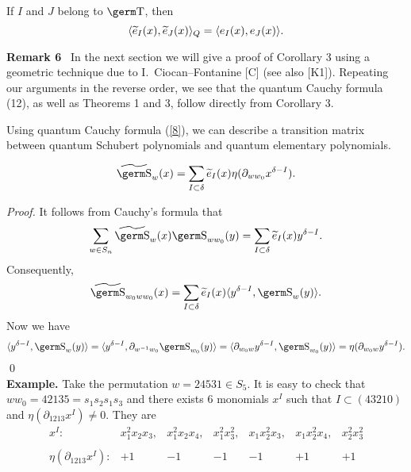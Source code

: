 {{\begin{col} If $I$ and $J$ belong to $\t$, then
$$\langle{\widetilde e}_I(x),{\widetilde e}_J(x)\rangle_Q=\langle 
e_I(x),e_J(x)\rangle .
$$
\end{col}
\vskip 0.3cm
{\bf Remark 6} \ In the next section we will give a proof of Corollary 3 
using a geometric technique due to I.~Ciocan--Fontanine [C] (see also 
[K1]). Repeating our arguments in the reverse order, we see that the 
quantum Cauchy formula (12), as well as Theorems 1 and 3, follow directly from 
Corollary 3.
\medskip

Using quantum Cauchy formula (\ref{8}), we can describe a transition matrix 
between quantum Schubert polynomials and quantum elementary polynomials.

\begin{th} 
$$\wt{\s}_w(x)=\ds\sum_{I\subset\delta}\wt e_I(x)\eta 
(\partial_{ww_0}x^{\delta -I}).$$
\end{th}

{\it Proof.} It follows from Cauchy's formula that
$$\sum_{w\in S_n}\wt{\s}_w(x)\s_{ww_0}(y)=
\sum_{I\subset\delta}\wt e_I(x)y^{\delta -I}.
$$
Consequently,
$$\wt{\s}_{w_0ww_0}(x)=\sum_{I\subset\delta}\wt e_I(x)\langle y^{\delta 
-I},\s_w(y)\rangle .
$$
Now we have
$$\langle y^{\delta -I},\s_w(y)\rangle =\langle y^{\delta -I},
\partial_{w^{-1}w_0}\s_{w_0}(y)\rangle =\langle\partial_{w_0w}y^{\delta 
-I},\s_{w_0}(y)\rangle =\eta (\partial_{w_0w}y^{\delta -I}).
$$
\qed
\smallskip \\ 
{\bf Example.} Take the permutation $w=24531\in S_5$. It is easy to check 
that 
$ww_0=42135=s_1s_2s_1s_3$ and there exists 6 monomials 
$x^I$ such that $I\subset (43210)$ and $\eta (\partial_{1213}x^I)\ne 0$. 
They are
$$\begin{array}{rcccccc} x^I:& x_1^2x_2x_3,& x_1^2x_2x_4, & x_1^2x_3^2,&
x_1x_2^2x_3,& x_1x_2^2x_4,& x_2^2x_3^2\\ \\
\eta(\partial_{1213}x^I):& +1& -1& -1& -1& +1& +1
\end{array}
$$

}}

